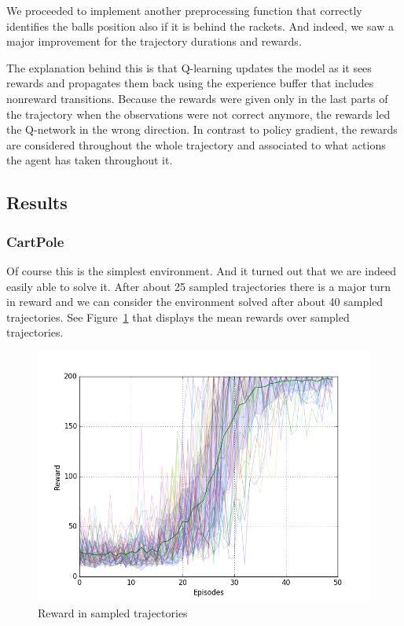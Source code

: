 \documentclass[10pt,a4paper]{article}
\begin{document}
We proceeded to implement another preprocessing function that correctly identifies the balls position also if it is behind the rackets. And indeed, we saw a major improvement for the trajectory durations and rewards.

The explanation behind this is that Q-learning updates the model as it sees rewards and propagates them back using the experience buffer that includes nonreward transitions. Because the rewards were given only in the last parts of the trajectory when the observations were not correct anymore, the rewards led the Q-network in the wrong direction. In contrast to policy gradient, the rewards are considered throughout the whole trajectory and associated to what actions the agent has taken throughout it.

\subsection{Results}

\subsubsection{CartPole}
Of course this is the simplest environment. And it turned out that we are indeed easily able to solve it. After about 25 sampled trajectories there is a major turn in reward and we can consider the environment solved after about 40 sampled trajectories. See Figure~\ref{fig:cartpole_reward} that displays the mean rewards over sampled trajectories.

\begin{figure}[!ht]
  \centering
  \includegraphics[width=1\textwidth]{./figures/cartpole_reward.png}
  \caption{Reward in sampled trajectories}
  \label{fig:cartpole_reward}
\end{figure}
\end{document}
